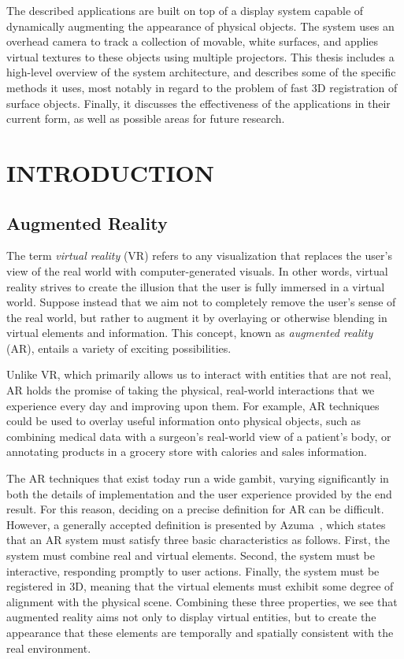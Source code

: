 \documentclass{thesis}
\begin{document}
The described applications are built on top of a display system capable of dynamically augmenting the appearance of physical objects. The system uses an overhead camera to track a collection of movable, white surfaces, and applies virtual textures to these objects using multiple projectors. This thesis includes a high-level overview of the system architecture, and describes some of the specific methods it uses, most notably in regard to the problem of fast 3D registration of surface objects. Finally, it discusses the effectiveness of the applications in their current form, as well as possible areas for future research.

\chapter{INTRODUCTION}

\section{Augmented Reality}

The term \emph{virtual reality} (VR) refers to any visualization that replaces the user's view of the real world with computer-generated visuals. In other words, virtual reality strives to create the illusion that the user is fully immersed in a virtual world. Suppose instead that we aim not to completely remove the user's sense of the real world, but rather to augment it by overlaying or otherwise blending in virtual elements and information. This concept, known as \emph{augmented reality} (AR), entails a variety of exciting possibilities. 

Unlike VR, which primarily allows us to interact with entities that are not real, AR holds the promise of taking the physical, real-world interactions that we experience every day and improving upon them. For example, AR techniques could be used to overlay useful information onto physical objects, such as combining medical data with a surgeon's real-world view of a patient's body, or annotating products in a grocery store with calories and sales information. 

The AR techniques that exist today run a wide gambit, varying significantly in both the details of implementation and the user experience provided by the end result. For this reason, deciding on a precise definition for AR can be difficult. However, a generally accepted definition is presented by Azuma~\cite{Azuma1997}, which states that an AR system must satisfy three basic characteristics as follows. First, the system must combine real and virtual elements. Second, the system must be interactive, responding promptly to user actions. Finally, the system must be registered in 3D, meaning that the virtual elements must exhibit some degree of alignment with the physical scene. Combining these three properties, we see that augmented reality aims not only to display virtual entities, but to create the appearance that these elements are temporally and spatially consistent with the real environment.
\end{document}

